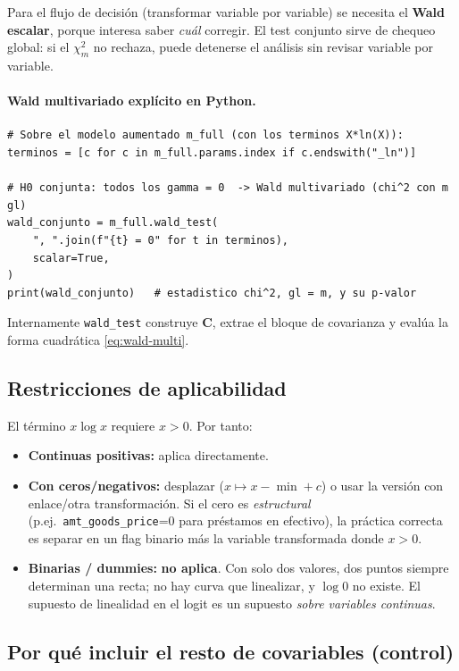 \documentclass[11pt]{article}
\theoremstyle{plain}
\theoremstyle{definition}
\theoremstyle{remark}
\begin{document}
Para el flujo de decisión (transformar variable por variable) se necesita el
\textbf{Wald escalar}, porque interesa saber \emph{cuál} corregir. El test
conjunto sirve de chequeo global: si el $\chi^2_m$ no rechaza, puede detenerse el
análisis sin revisar variable por variable.

\paragraph{Wald multivariado explícito en Python.}
\begin{lstlisting}[style=py]
# Sobre el modelo aumentado m_full (con los terminos X*ln(X)):
terminos = [c for c in m_full.params.index if c.endswith("_ln")]

# H0 conjunta: todos los gamma = 0  -> Wald multivariado (chi^2 con m gl)
wald_conjunto = m_full.wald_test(
    ", ".join(f"{t} = 0" for t in terminos),
    scalar=True,
)
print(wald_conjunto)   # estadistico chi^2, gl = m, y su p-valor
\end{lstlisting}
Internamente \texttt{wald\_test} construye $\bm C$, extrae el bloque de
covarianza y evalúa la forma cuadrática \eqref{eq:wald-multi}.

\subsection{Restricciones de aplicabilidad}

El término $x\log x$ requiere $x>0$. Por tanto:
\begin{itemize}
  \item \textbf{Continuas positivas:} aplica directamente.
  \item \textbf{Con ceros/negativos:} desplazar ($x\mapsto x-\min+c$) o usar la
        versión con enlace/otra transformación. Si el cero es
        \emph{estructural} (p.ej.\ \texttt{amt\_goods\_price}=0 para préstamos en
        efectivo), la práctica correcta es separar en un flag binario más la
        variable transformada donde $x>0$.
  \item \textbf{Binarias / dummies:} \textbf{no aplica}. Con solo dos valores,
        dos puntos siempre determinan una recta; no hay curva que linealizar, y
        $\log 0$ no existe. El supuesto de linealidad en el logit es un supuesto
        \emph{sobre variables continuas}.
\end{itemize}

\subsection{Por qué incluir el resto de covariables (control)}
\end{document}
